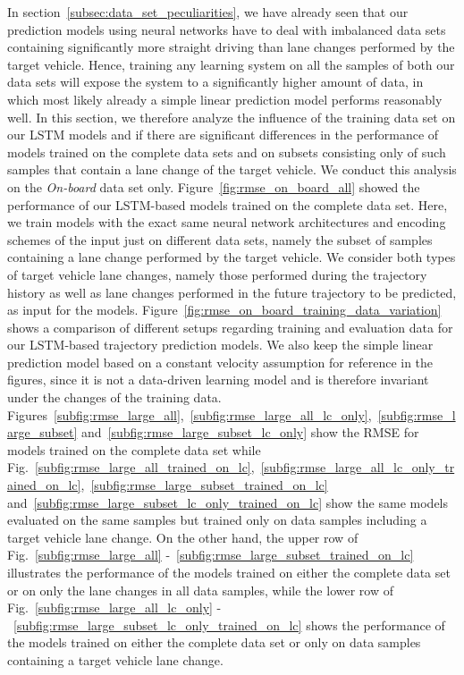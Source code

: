 In section~\ref{subsec:data_set_peculiarities}, we have already seen that our prediction models using neural networks have to deal with imbalanced data sets containing significantly more straight driving than lane changes performed by the target vehicle.
Hence, training any learning system on all the samples of both our data sets will expose the system to a significantly higher amount of data, in which most likely already a simple linear prediction model performs reasonably well. 
In this section, we therefore analyze the influence of the training data set on our \ac{LSTM} models and if there are significant differences in the performance of models trained on the complete data sets and on subsets consisting only of such samples that contain a lane change of the target vehicle.
We conduct this analysis on the \emph{On-board} data set only.
Figure~\ref{fig:rmse_on_board_all} showed the performance of our \ac{LSTM}-based models trained on the complete data set.
Here, we train models with the exact same neural network architectures and encoding schemes of the input just on different data sets, namely the subset of samples containing a lane change performed by the target vehicle.
We consider both types of target vehicle lane changes, namely those performed during the trajectory history as well as lane changes performed in the future trajectory to be predicted, as input for the models.
Figure~\ref{fig:rmse_on_board_training_data_variation} shows a comparison of different setups regarding training and evaluation data for our \ac{LSTM}-based trajectory prediction models.
We also keep the simple linear prediction model based on a constant velocity assumption for reference in the figures, since it is not a data-driven learning model and is therefore invariant under the changes of the training data.
Figures~\ref{subfig:rmse_large_all},~\ref{subfig:rmse_large_all_lc_only},~\ref{subfig:rmse_large_subset} and~\ref{subfig:rmse_large_subset_lc_only} show the \ac{RMSE} for models trained on the complete data set while Fig.~\ref{subfig:rmse_large_all_trained_on_lc},~\ref{subfig:rmse_large_all_lc_only_trained_on_lc},~\ref{subfig:rmse_large_subset_trained_on_lc} and~\ref{subfig:rmse_large_subset_lc_only_trained_on_lc} show the same models evaluated on the same samples but trained
only on data samples including a target vehicle lane change.
On the other hand, the upper row of Fig.~\ref{subfig:rmse_large_all} -~\ref{subfig:rmse_large_subset_trained_on_lc} illustrates the performance of the models trained on either the complete data set or on only the lane changes in all data samples, while the lower row of Fig.~\ref{subfig:rmse_large_all_lc_only} -~\ref{subfig:rmse_large_subset_lc_only_trained_on_lc} shows the performance of the models trained on either the complete data set or only on data samples containing a target vehicle lane change.

